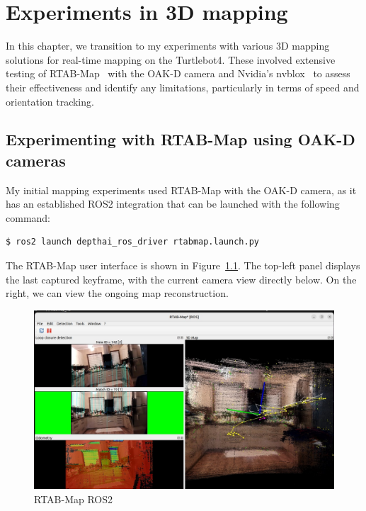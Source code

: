 \chapter{Experiments in 3D mapping} \label{experiments_3d_mapping}

In this chapter, we transition to my experiments with various 3D mapping solutions for real-time mapping on the Turtlebot4. These involved extensive testing of RTAB-Map~\cite{RTAB_Map_docs} with the OAK-D camera and Nvidia's nvblox~\cite{nvblox_docs} to assess their effectiveness and identify any limitations, particularly in terms of speed and orientation tracking.

\section{Experimenting with RTAB-Map using OAK-D cameras} \label{experiments_rtab_map}

My initial mapping experiments used RTAB-Map with the OAK-D camera, as it has an established ROS2 integration that can be launched with the following command:

\FloatBarrier
\begin{lstlisting}[language=bash,frame=single,float=!ht]
$ ros2 launch depthai_ros_driver rtabmap.launch.py
\end{lstlisting}

The RTAB-Map user interface is shown in Figure~\ref{fig:rtabmap_ros}. The top-left panel displays the last captured keyframe, with the current camera view directly below. On the right, we can view the ongoing map reconstruction.

\begin{figure}[htbp]
	\centering
	\includegraphics[width=150mm, keepaspectratio]{figures_jpg/rtabmap_ros.jpg}
	\caption{RTAB-Map ROS2}
	\label{fig:rtabmap_ros}
\end{figure}

